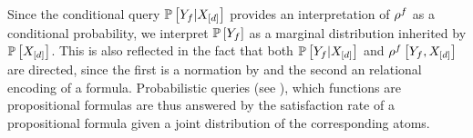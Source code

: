 Since the conditional query $\mathbb{P}\left[Y_{f}|X_{[d]}\right]$ provides an interpretation of $\rho^{f}$ as a conditional probability, we interpret $\mathbb{P}\left[Y_{f}\right]$ as a marginal distribution inherited by $\mathbb{P}\left[X_{[d]}\right]$.
This is also reflected in the fact that both $\mathbb{P}\left[Y_{f}|X_{[d]}\right]$ and $\rho^{f}\left[Y_{f},X_{[d]}\right]$ are directed, since the first is a normation by  and the second an relational encoding of a formula.
Probabilistic queries (see ), which functions are propositional formulas are thus answered by the satisfaction rate of a propositional formula given a joint distribution of the corresponding atoms.


%	



%		
%

